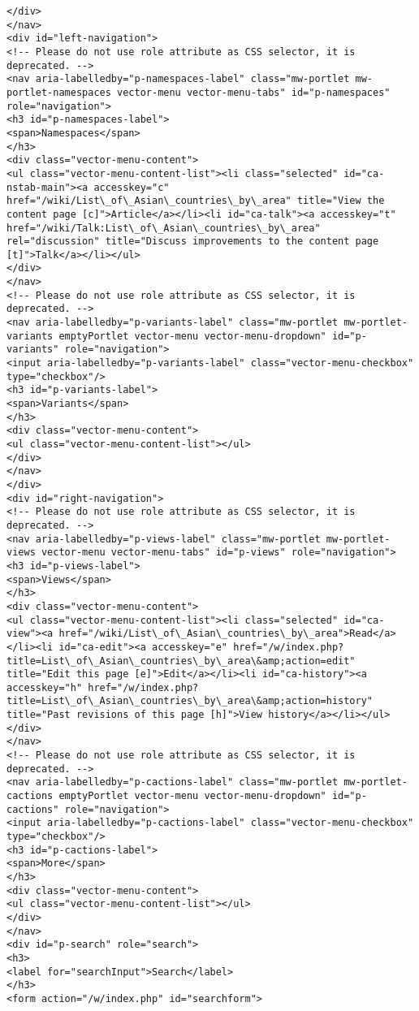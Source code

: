 \documentclass[11pt]{article}
\begin{document}
\begin{Verbatim}[commandchars=\\\{\}]
</div>
</nav>
<div id="left-navigation">
<!-- Please do not use role attribute as CSS selector, it is deprecated. -->
<nav aria-labelledby="p-namespaces-label" class="mw-portlet mw-portlet-namespaces vector-menu vector-menu-tabs" id="p-namespaces" role="navigation">
<h3 id="p-namespaces-label">
<span>Namespaces</span>
</h3>
<div class="vector-menu-content">
<ul class="vector-menu-content-list"><li class="selected" id="ca-nstab-main"><a accesskey="c" href="/wiki/List\_of\_Asian\_countries\_by\_area" title="View the content page [c]">Article</a></li><li id="ca-talk"><a accesskey="t" href="/wiki/Talk:List\_of\_Asian\_countries\_by\_area" rel="discussion" title="Discuss improvements to the content page [t]">Talk</a></li></ul>
</div>
</nav>
<!-- Please do not use role attribute as CSS selector, it is deprecated. -->
<nav aria-labelledby="p-variants-label" class="mw-portlet mw-portlet-variants emptyPortlet vector-menu vector-menu-dropdown" id="p-variants" role="navigation">
<input aria-labelledby="p-variants-label" class="vector-menu-checkbox" type="checkbox"/>
<h3 id="p-variants-label">
<span>Variants</span>
</h3>
<div class="vector-menu-content">
<ul class="vector-menu-content-list"></ul>
</div>
</nav>
</div>
<div id="right-navigation">
<!-- Please do not use role attribute as CSS selector, it is deprecated. -->
<nav aria-labelledby="p-views-label" class="mw-portlet mw-portlet-views vector-menu vector-menu-tabs" id="p-views" role="navigation">
<h3 id="p-views-label">
<span>Views</span>
</h3>
<div class="vector-menu-content">
<ul class="vector-menu-content-list"><li class="selected" id="ca-view"><a href="/wiki/List\_of\_Asian\_countries\_by\_area">Read</a></li><li id="ca-edit"><a accesskey="e" href="/w/index.php?title=List\_of\_Asian\_countries\_by\_area\&amp;action=edit" title="Edit this page [e]">Edit</a></li><li id="ca-history"><a accesskey="h" href="/w/index.php?title=List\_of\_Asian\_countries\_by\_area\&amp;action=history" title="Past revisions of this page [h]">View history</a></li></ul>
</div>
</nav>
<!-- Please do not use role attribute as CSS selector, it is deprecated. -->
<nav aria-labelledby="p-cactions-label" class="mw-portlet mw-portlet-cactions emptyPortlet vector-menu vector-menu-dropdown" id="p-cactions" role="navigation">
<input aria-labelledby="p-cactions-label" class="vector-menu-checkbox" type="checkbox"/>
<h3 id="p-cactions-label">
<span>More</span>
</h3>
<div class="vector-menu-content">
<ul class="vector-menu-content-list"></ul>
</div>
</nav>
<div id="p-search" role="search">
<h3>
<label for="searchInput">Search</label>
</h3>
<form action="/w/index.php" id="searchform">

\end{Verbatim}
\end{document}
